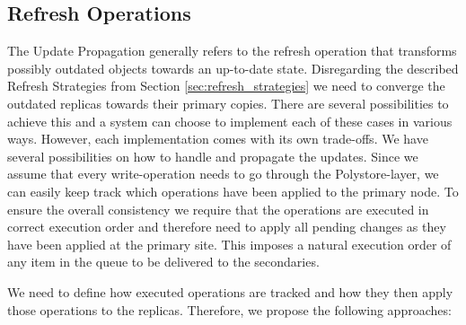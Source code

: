 \subsection{Refresh Operations}
\label{sec:refresh_operations}

The Update Propagation generally refers to the refresh operation that transforms possibly outdated objects towards an up-to-date state.
Disregarding the described Refresh Strategies from Section \ref{sec:refresh_strategies} we need to converge the outdated replicas towards their 
primary copies.
There are several possibilities to achieve this and a system can choose to implement each of these cases in various ways. However, each implementation comes with its
own trade-offs.
We have several possibilities on how to handle and propagate the updates.
Since we assume that every write-operation needs to go through the Polystore-layer, we can easily keep track which operations have been applied to the primary node.
To ensure the overall consistency we require that the operations are executed in correct execution order and therefore need to apply all pending changes as they have been applied at the primary site.
This imposes a natural execution order of any item in the queue to be delivered to the secondaries.

We need to define how executed operations are tracked and how they then apply those operations to the replicas. 
Therefore, we propose the following approaches: \\

